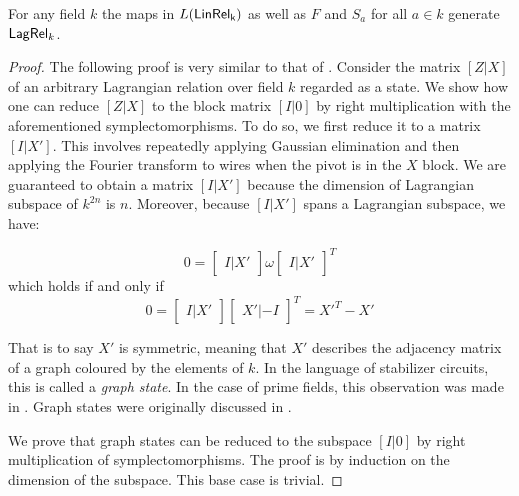 \begin{theorem}
\label{theorem:generators}
For any field $k$ the maps in $L(\sf LinRel_k)$ as well as $F$ and $S_a$ for all $a \in k$ generate $\mathsf{Lag}\mathsf{Rel}_k$.
\end{theorem}

\begin{proof}
The following proof is very similar to that of  \cite[Lem. 6]{aaronson}.
Consider the matrix $[Z|X]$ of an arbitrary Lagrangian relation over field $k$ regarded as a state.
%
We show how one can reduce $[Z|X]$ to the block matrix $[I|0]$ by right multiplication with the aforementioned symplectomorphisms.
To do so, we first reduce it to a matrix $[I|X']$.
This involves repeatedly applying Gaussian elimination and then applying the Fourier transform to wires when the pivot is in the $X$ block.
We are guaranteed to obtain a matrix $[I|X']$ because the dimension of Lagrangian subspace of $k^{2n}$ is $n$. Moreover, because  $[I|X']$ spans a Lagrangian subspace, we have: 

$$
0
=
\begin{bmatrix}
I | X'
\end{bmatrix}
\omega
\begin{bmatrix}
I | X'
\end{bmatrix}^T
$$
which holds if and only if 
$$
0=
\begin{bmatrix}
I | X'
\end{bmatrix}
\begin{bmatrix}
X' | -I 
\end{bmatrix}^T
=
{X'}^T-X'
$$

That is to say $X'$ is symmetric, meaning that $X'$ describes the adjacency matrix of a graph coloured by the elements of $k$.
In the language of stabilizer circuits, this is called a {\em graph state}.  In the case of prime fields, this observation was made in \cite[Equation 18]{gross}.  Graph states were originally discussed in \cite{hein2006entanglement}.

We prove that graph states can be reduced to the subspace $[I|0]$ by right multiplication of  symplectomorphisms.
The proof is by induction on the dimension of the subspace.
This base case is trivial.


\end{proof}
